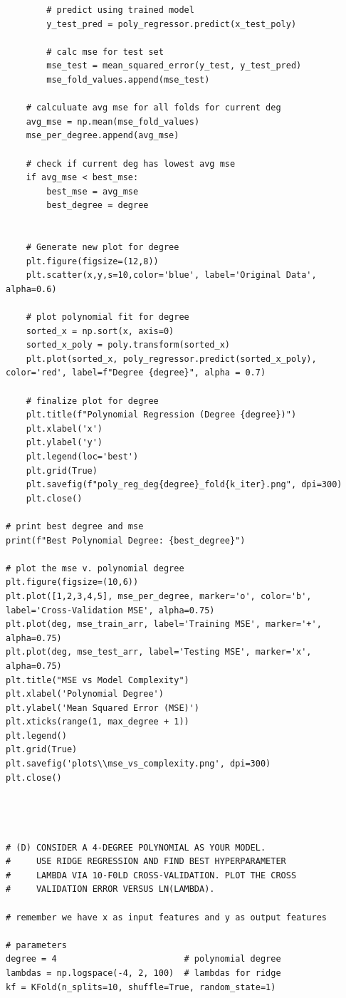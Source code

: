 \documentclass[11pt]{article}
\begin{document}
\begin{lstlisting}
        # predict using trained model
        y_test_pred = poly_regressor.predict(x_test_poly)

        # calc mse for test set
        mse_test = mean_squared_error(y_test, y_test_pred)
        mse_fold_values.append(mse_test)

    # calculuate avg mse for all folds for current deg
    avg_mse = np.mean(mse_fold_values)
    mse_per_degree.append(avg_mse)

    # check if current deg has lowest avg mse
    if avg_mse < best_mse:
        best_mse = avg_mse
        best_degree = degree
    

    # Generate new plot for degree
    plt.figure(figsize=(12,8))
    plt.scatter(x,y,s=10,color='blue', label='Original Data', alpha=0.6)

    # plot polynomial fit for degree
    sorted_x = np.sort(x, axis=0)
    sorted_x_poly = poly.transform(sorted_x)
    plt.plot(sorted_x, poly_regressor.predict(sorted_x_poly), color='red', label=f"Degree {degree}", alpha = 0.7)

    # finalize plot for degree
    plt.title(f"Polynomial Regression (Degree {degree})")
    plt.xlabel('x')
    plt.ylabel('y')
    plt.legend(loc='best')
    plt.grid(True)
    plt.savefig(f"poly_reg_deg{degree}_fold{k_iter}.png", dpi=300)
    plt.close()

# print best degree and mse
print(f"Best Polynomial Degree: {best_degree}")

# plot the mse v. polynomial degree
plt.figure(figsize=(10,6))
plt.plot([1,2,3,4,5], mse_per_degree, marker='o', color='b', label='Cross-Validation MSE', alpha=0.75)
plt.plot(deg, mse_train_arr, label='Training MSE', marker='+', alpha=0.75)
plt.plot(deg, mse_test_arr, label='Testing MSE', marker='x', alpha=0.75)
plt.title("MSE vs Model Complexity")
plt.xlabel('Polynomial Degree')
plt.ylabel('Mean Squared Error (MSE)')
plt.xticks(range(1, max_degree + 1))
plt.legend()
plt.grid(True)
plt.savefig('plots\\mse_vs_complexity.png', dpi=300)
plt.close()




# (D) CONSIDER A 4-DEGREE POLYNOMIAL AS YOUR MODEL.
#     USE RIDGE REGRESSION AND FIND BEST HYPERPARAMETER
#     LAMBDA VIA 10-F0LD CROSS-VALIDATION. PLOT THE CROSS
#     VALIDATION ERROR VERSUS LN(LAMBDA).

# remember we have x as input features and y as output features

# parameters
degree = 4                         # polynomial degree
lambdas = np.logspace(-4, 2, 100)  # lambdas for ridge
kf = KFold(n_splits=10, shuffle=True, random_state=1)


\end{lstlisting}
\end{document}
